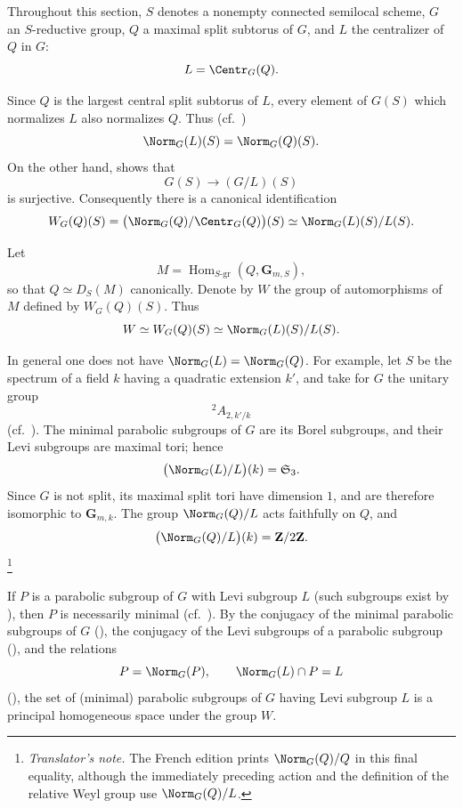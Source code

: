 
Throughout this section, \(S\) denotes a nonempty connected
semilocal scheme, \(G\) an \(S\)-reductive group, \(Q\) a maximal
split subtorus of \(G\), and \(L\) the centralizer of \(Q\) in \(G\):
\[
 L=\Centr_G(Q).
\]


Since \(Q\) is the largest central split subtorus of \(L\), every
element of \(G(S)\) which normalizes \(L\) also normalizes \(Q\).
Thus \textup{(cf.\ )}
\[
 \Norm_G(L)(S)=\Norm_G(Q)(S).
\]
On the other hand,  shows that
\[
 G(S)\longrightarrow(G/L)(S)
\]
is surjective.  Consequently there is a canonical identification
\[
 W_G(Q)(S)
 =\bigl(\Norm_G(Q)/\Centr_G(Q)\bigr)(S)
 \simeq\Norm_G(L)(S)/L(S).
\]

Let
\[
 M=\operatorname{Hom}_{S\text{-}\mathrm{gr}}
      (Q,\mathbf G_{m,S}),
\]
so that \(Q\simeq D_S(M)\) canonically.  Denote by \(W\) the group
of automorphisms of \(M\) defined by \(W_G(Q)(S)\).  Thus
\[
 W\simeq W_G(Q)(S)\simeq\Norm_G(L)(S)/L(S).
\]


In general one does not have
\(\Norm_G(L)=\Norm_G(Q)\).  For example, let \(S\) be the spectrum of
a field \(k\) having a quadratic extension \(k'\), and take for
\(G\) the unitary group
\[
 {}^2\!A_{2,k'/k}
\]
\textup{(cf.\ )}.  The minimal parabolic
subgroups of \(G\) are its Borel subgroups, and their Levi subgroups
are maximal tori; hence
\[
 \bigl(\Norm_G(L)/L\bigr)(k)=\mathfrak S_3.
\]
Since \(G\) is not split, its maximal split tori have dimension \(1\),
and are therefore isomorphic to \(\mathbf G_{m,k}\).
The group \(\Norm_G(Q)/L\) acts faithfully on \(Q\), and
\[
 \bigl(\Norm_G(Q)/L\bigr)(k)=\mathbf Z/2\mathbf Z.
\]
\footnote{\emph{Translator's note.} The French edition prints
\(\Norm_G(Q)/Q\) in this final equality, although the immediately
preceding action and the definition of the relative Weyl group use
\(\Norm_G(Q)/L\).}


If \(P\) is a parabolic subgroup of \(G\) with Levi subgroup \(L\)
\textup{(such subgroups exist by )}, then \(P\) is necessarily minimal
\textup{(cf.\ )}.  By the conjugacy of the minimal parabolic
subgroups of \(G\) \textup{()}, the conjugacy of the Levi subgroups of a
parabolic subgroup \textup{()}, and the relations
\[
 P=\Norm_G(P),\qquad \Norm_G(L)\cap P=L
\]
\textup{()}, the set of \textup{(minimal)} parabolic subgroups of \(G\)
having Levi subgroup \(L\) is a principal homogeneous space under the
group \(W\).

